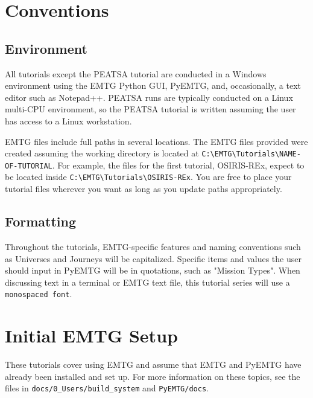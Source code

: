 \documentclass[11pt]{article}
\begin{document}
\section{Conventions}
\label{sec:conventions}

\subsection{Environment}
\label{sec:environment}

All tutorials except the \ac{PEATSA} tutorial are conducted in a Windows environment using the \ac{EMTG} Python \ac{GUI}, PyEMTG, and, occasionally, a text editor such as Notepad++. \ac{PEATSA} runs are typically conducted on a Linux multi-CPU environment, so the \ac{PEATSA} tutorial is written assuming the user has access to a Linux workstation.

\noindent \ac{EMTG} files include full paths in several locations. The \ac{EMTG} files provided were created assuming the working directory is located at \texttt{C:\textbackslash EMTG\textbackslash Tutorials\textbackslash NAME-OF-TUTORIAL}. For example, the files for the first tutorial, OSIRIS-REx, expect to be located inside \texttt{C:\textbackslash EMTG\textbackslash Tutorials\textbackslash OSIRIS-REx}. You are free to place your tutorial files wherever you want as long as you update paths appropriately.

\subsection{Formatting}
\label{sec:formatting}

Throughout the tutorials, \ac{EMTG}-specific features and naming conventions such as Universes and Journeys will be capitalized. Specific items and values the user should input in PyEMTG will be in quotations, such as "Mission Types". When discussing text in a terminal or \ac{EMTG} text file, this tutorial series will use a \texttt{monospaced font}.

\section{Initial EMTG Setup}
\label{sec:initial_emtg_setup}

These tutorials cover using \ac{EMTG} and assume that \ac{EMTG} and PyEMTG have already been installed and set up. For more information on these topics, see the files in \texttt{docs/0\_Users/build\_system} and \texttt{PyEMTG/docs}.
\end{document}
